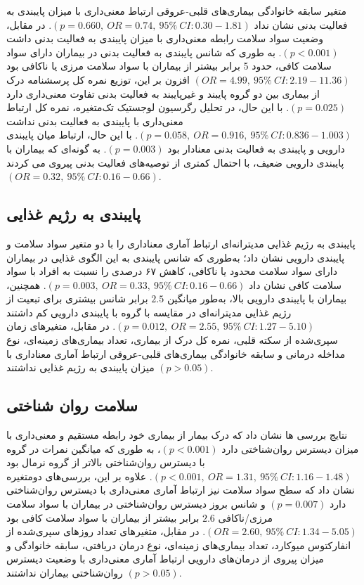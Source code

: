 متغیر سابقه خانوادگی بیماری‌های قلبی-عروقی ارتباط معنی‌داری با میزان پایبندی به فعالیت بدنی نشان نداد $(p=0.660, \ OR=0.74, \ 95\% \ CI:0.30-1.81)$. در مقابل، وضعیت سواد سلامت رابطه معنی‌داری با میزان پایبندی به فعالیت بدنی داشت $(p<0.001)$. به طوری که شانس پایبندی به فعالیت بدنی در بیماران دارای سواد سلامت کافی، حدود 5 برابر بیشتر از بیماران با سواد سلامت مرزی یا ناکافی بود $(OR=4.99, \ 95\% \ CI:2.19-11.36)$ افزون بر این، توزیع نمره کل پرسشنامه درک از بیماری بین دو گروه پایبند و غیرپایبند به فعالیت بدنی تفاوت معنی‌داری دارد $(p=0.025)$. با این حال، در تحلیل رگرسیون لوجستیک تک‌متغیره، نمره کل  ارتباط معنی‌داری با پایبندی به فعالیت بدنی نداشت $(p =0.058, \ OR=0.916, \ 95\% \ CI:0.836-1.003)$. با این حال، ارتباط میان پایبندی دارویی و پایبندی به فعالیت بدنی معنادار بود $(p=0.003)$. به گونه‌ای که بیماران با پایبندی دارویی ضعیف، با احتمال کمتری از توصیه‌های فعالیت بدنی پیروی می کردند $(OR=0.32, \ 95\% \ CI:0.16-0.66)$.



\subsection*{\textbf{پایبندی به رژیم غذایی}}


پایبندی به رژیم غذایی مدیترانه‌ای ارتباط آماری معناداری را با دو متغیر سواد سلامت و پایبندی دارویی نشان داد؛ به‌طوری که شانس پایبندی به این الگوی غذایی در بیماران دارای سواد سلامت محدود یا ناکافی، کاهش ۶۷ درصدی را نسبت به افراد با سواد سلامت کافی نشان داد $(p =0.003, \ OR=0.33, \ 95\% \ CI:0.16-0.66)$. همچنین، بیماران با پایبندی دارویی بالا، به‌طور میانگین $2.5$ برابر شانس بیشتری برای تبعیت از رژیم غذایی مدیترانه‌ای در مقایسه با گروه با پایبندی دارویی کم داشتند $(p =0.012, \ OR=2.55, \ 95\% \ CI:1.27-5.10)$. در مقابل، متغیرهای زمان سپری‌شده از سکته قلبی، نمره کل درک از بیماری، تعداد بیماری‌های زمینه‌ای، نوع مداخله درمانی و سابقه خانوادگی بیماری‌های قلبی-عروقی ارتباط آماری معناداری با میزان پایبندی به رژیم غذایی نداشتند $(p>0.05)$.



\subsection*{\textbf{سلامت روان شناختی}}


نتایج بررسی ها نشان داد که درک بیمار از بیماری خود رابطه مستقیم و معنی‌داری با میزان دیسترس روان‌شناختی دارد $(p<0.001)$، به طوری که میانگین نمرات در گروه با دیسترس روان‌شناختی بالاتر از گروه نرمال بود $(p < 0.001, \ OR=1.31, \ 95\% \ CI:1.16 - 1.48)$. علاوه بر این، بررسی‌های دومتغیره نشان داد که سطح سواد سلامت نیز ارتباط آماری معنی‌داری با دیسترس روان‌شناختی دارد $(p=0.007)$ و شانس بروز دیسترس روان‌شناختی در بیماران با سواد سلامت مرزی/ناکافی $2.6$ برابر بیشتر از بیماران با سواد سلامت کافی بود $(OR=2.60, \ 95\% \ CI:1.34-5.05)$. در مقابل، متغیرهای تعداد روزهای سپری‌شده از انفارکتوس میوکارد، تعداد بیماری‌های زمینه‌ای، نوع درمان دریافتی، سابقه خانوادگی و میزان پیروی از درمان‌های دارویی ارتباط آماری معنی‌داری با وضعیت دیسترس روان‌شناختی بیماران نداشتند $(p>0.05)$.


